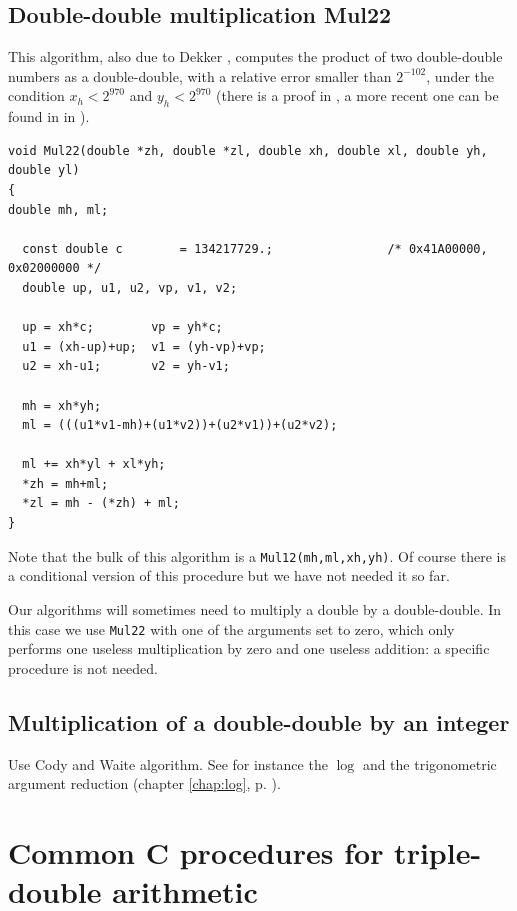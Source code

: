 \subsection{Double-double multiplication {Mul22}}
  
This algorithm, also due to Dekker \cite{Dek71}, computes the product of
two double-double numbers as a double-double, with a relative error
smaller than $2^{-102}$, under the condition $x_h<2^{970}$ and $y_h<2^{970}$  (there is a proof in \cite{Dek71}, a more recent one can be found in in \cite{Lau05}). 

\begin{lstlisting}[label={Mul22},caption={Mul22},firstnumber=1]
void Mul22(double *zh, double *zl, double xh, double xl, double yh, double yl)
{
double mh, ml;

  const double c        = 134217729.;                /* 0x41A00000, 0x02000000 */ 
  double up, u1, u2, vp, v1, v2;

  up = xh*c;        vp = yh*c;
  u1 = (xh-up)+up;  v1 = (yh-vp)+vp;
  u2 = xh-u1;       v2 = yh-v1;
  
  mh = xh*yh;
  ml = (((u1*v1-mh)+(u1*v2))+(u2*v1))+(u2*v2);

  ml += xh*yl + xl*yh;
  *zh = mh+ml;
  *zl = mh - (*zh) + ml;
}  
\end{lstlisting}

Note that the bulk of this algorithm is a \texttt{Mul12(mh,ml,xh,yh)}.
Of course there is a conditional version of this procedure but we have not needed it so far.

Our algorithms will sometimes need to multiply a double by a
double-double. In this case we use \texttt{Mul22} with one of the
arguments set to zero, which only performs one useless multiplication
by zero and one useless addition: a specific procedure is not needed.




\subsection{Multiplication of a double-double by an integer}


Use Cody and Waite algorithm. See for instance the $\log$ and the
trigonometric argument reduction (chapter \ref{chap:log}, p.
\pageref{chap:log}).


\section{Common C procedures for triple-double arithmetic\label{section:commonCtripledouble}}

